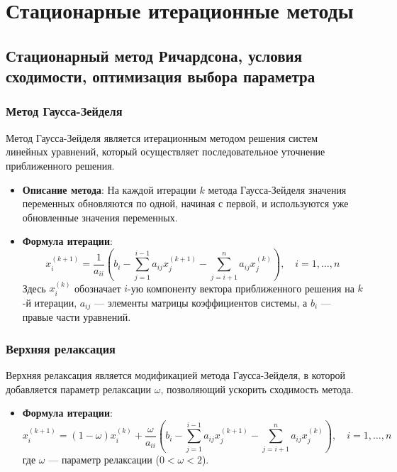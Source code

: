\documentclass{article}
\begin{document}
\section{Стационарные итерационные методы}

\subsection{Стационарный метод Ричардсона, условия сходимости, оптимизация выбора параметра}
\subsubsection{Метод Гаусса-Зейделя}

Метод Гаусса-Зейделя является итерационным методом решения систем линейных уравнений, который осуществляет последовательное уточнение приближенного решения.

\begin{itemize}
  \item \textbf{Описание метода}: На каждой итерации \( k \) метода Гаусса-Зейделя значения переменных обновляются по одной, начиная с первой, и используются уже обновленные значения переменных.
  
  \item \textbf{Формула итерации}:
  \[
  x_i^{(k+1)} = \frac{1}{a_{ii}} \left( b_i - \sum_{j=1}^{i-1} a_{ij} x_j^{(k+1)} - \sum_{j=i+1}^{n} a_{ij} x_j^{(k)} \right), \quad i = 1, \ldots, n
  \]
  Здесь \( x_i^{(k)} \) обозначает \( i \)-ую компоненту вектора приближенного решения на \( k \)-й итерации, \( a_{ij} \) — элементы матрицы коэффициентов системы, а \( b_i \) — правые части уравнений.
\end{itemize}

\subsubsection{Верхняя релаксация}

Верхняя релаксация является модификацией метода Гаусса-Зейделя, в которой добавляется параметр релаксации \( \omega \), позволяющий ускорить сходимость метода.

\begin{itemize}
  \item \textbf{Формула итерации}:
  \[
  x_i^{(k+1)} = (1-\omega) x_i^{(k)} + \frac{\omega}{a_{ii}} \left( b_i - \sum_{j=1}^{i-1} a_{ij} x_j^{(k+1)} - \sum_{j=i+1}^{n} a_{ij} x_j^{(k)} \right), \quad i = 1, \ldots, n
  \]
  где \( \omega \) — параметр релаксации (\( 0 < \omega < 2 \)).
\end{itemize}
\end{document}

